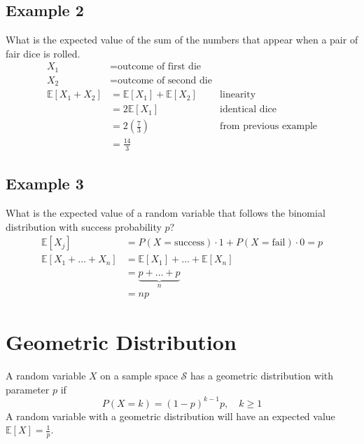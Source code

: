 \documentclass{article}
\theoremstyle{mytheoremstyle}
\theoremstyle{mytheoremstyle}
\theoremstyle{myproblemstyle}
\begin{document}
    \subsection*{Example 2}
    What is the expected value of the sum of the numbers that appear when a pair
    of fair dice is rolled.
    \begin{align*}
        X_1 &= \text{outcome of first die} \\
        X_2 &= \text{outcome of second die} \\
        \mathbb{E}[X_1 + X_2] &= \mathbb{E}[X_1] + \mathbb{E}[X_2] & \text{linearity} \\
                              &= 2 \mathbb{E}[X_1] & \text{identical dice}\\
                              &= 2 (\frac{7}{3}) & \text{from previous example} \\
                              &= \frac{14}{3}
    \end{align*}

    \subsection*{Example 3}
    What is the expected value of a random variable that follows the binomial
    distribution with success probability $p$?
    \begin{align*}
        \mathbb{E}[X_j] &= P(X=\text{success})\cdot 1 + P(X=\text{fail})\cdot 0 = p \\
        \mathbb{E}[X_1 + \dots + X_n] &= \mathbb{E}[X_1] + \dots + \mathbb{E}[X_n] \\
                                      &= \underbrace{p + \dots + p}_n \\
                                      &= np
    \end{align*}

    \section*{Geometric Distribution}
    A random variable $X$ on a sample space $\mathcal{S}$ has a geometric
    distribution with parameter $p$ if
    \[
        P(X=k) = (1-p)^{k-1}p,\quad k\ge 1
    \]
    A random variable with a geometric distribution will have an expected value
    $\mathbb{E}[X]=\frac{1}{p}$.
\end{document}
